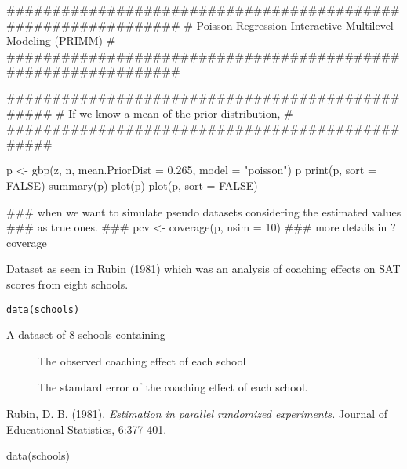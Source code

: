\documentclass[a4paper]{book}
\begin{document}
\begin{Examples}
\begin{ExampleCode}
  ##############################################################
  # Poisson Regression Interactive Multilevel Modeling (PRIMM) #
  ##############################################################

    ################################################
    # If we know a mean of the prior distribution, #
    ################################################

    p <- gbp(z, n, mean.PriorDist = 0.265, model = "poisson")
    p
    print(p, sort = FALSE)
    summary(p)
    plot(p)
    plot(p, sort = FALSE)

    ### when we want to simulate pseudo datasets considering the estimated values 
    ### as true ones.
    ### pcv <- coverage(p, nsim = 10)  
    ### more details in ?coverage 

\end{ExampleCode}
\end{Examples}
%
\begin{Description}\relax
Dataset as seen in Rubin (1981) which was an analysis of coaching
effects on SAT scores from eight schools.
\end{Description}
%
\begin{Usage}
\begin{verbatim}
data(schools)
\end{verbatim}
\end{Usage}
%
\begin{Format}
A dataset of 8 schools containing
\begin{description}

\item[] The observed coaching effect of each school
\item[] The standard error of the coaching effect of each school.

\end{description}

\end{Format}
%
\begin{Source}\relax
Rubin, D. B. (1981). \emph{Estimation in parallel randomized
experiments.} Journal of Educational Statistics, 6:377-401.
\end{Source}
%
\begin{Examples}
\begin{ExampleCode}
  data(schools)
\end{ExampleCode}
\end{Examples}
\end{document}
